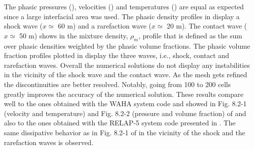 \documentclass{inputs/mc2015}
\begin{document}
%
The phasic pressures (), velocities () and temperatures () are equal as expected since a large interfacial area was used. The phasic density profiles in  display a shock wave ($x \simeq$ 60 m) and a rarefaction wave ($x \simeq$ 20 m). The contact wave ($x \simeq$ 50 m) shows in the mixture density, $\rho_{m}$, profile that is defined as the sum over phasic densities weighted by the phasic volume fractions. The phasic volume fraction profiles plotted in  display the three waves, i.e., shock, contact and rarefaction waves. Overall the numerical solutions do not display any instabilities in the vicinity of the shock wave and the contact wave. As the mesh gets refined the discontinuities are better resolved. Notably, going from 100 to 200 cells greatly improves the accuracy of the numerical solution. These results compare well to the ones obtained with the WAHA system code and showed in Fig. 8.2-1 (velocity and temperature) and Fig. 8.2-2 (pressure and volume fraction) of \cite{waha-manual} and also to the ones obtained with the RELAP-5 system code presented in \cite{Sokolowski-Koszela}. The same dissipative behavior as in Fig. 8.2-1 of \cite{waha-manual} in the vicinity of the shock and the rarefaction waves is observed. 
%
%
\end{document}
